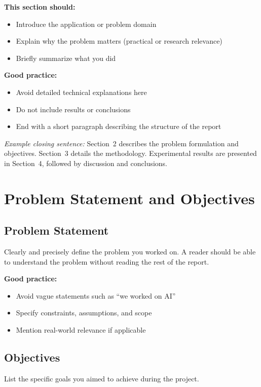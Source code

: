 \documentclass{article}
\begin{document}
\textbf{This section should:}
\begin{itemize}[noitemsep]
    \item Introduce the application or problem domain
    \item Explain why the problem matters (practical or research relevance)
    \item Briefly summarize what you did
\end{itemize}

\textbf{Good practice:}
\begin{itemize}[noitemsep]
    \item Avoid detailed technical explanations here
    \item Do not include results or conclusions
    \item End with a short paragraph describing the structure of the report
\end{itemize}

\emph{Example closing sentence:}
Section~2 describes the problem formulation and objectives. 
Section~3 details the methodology. 
Experimental results are presented in Section~4, followed by discussion and conclusions.

\section{Problem Statement and Objectives}

\subsection{Problem Statement}
Clearly and precisely define the problem you worked on.
A reader should be able to understand the problem without reading the rest of the report.

\textbf{Good practice:}
\begin{itemize}[noitemsep]
    \item Avoid vague statements such as ``we worked on AI''
    \item Specify constraints, assumptions, and scope
    \item Mention real-world relevance if applicable
\end{itemize}

\subsection{Objectives}
List the specific goals you aimed to achieve during the project.
\end{document}
